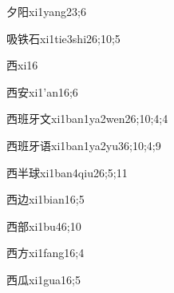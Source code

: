 
\begin{verbete}{夕阳}{xi1yang2}{3;6}
\end{verbete}

\begin{verbete}{吸铁石}{xi1tie3shi2}{6;10;5}
\end{verbete}

\begin{verbete}{西}{xi1}{6}
\end{verbete}

\begin{verbete}{西安}{xi1'an1}{6;6}
\end{verbete}

\begin{verbete}{西班牙文}{xi1ban1ya2wen2}{6;10;4;4}
\end{verbete}

\begin{verbete}{西班牙语}{xi1ban1ya2yu3}{6;10;4;9}
\end{verbete}

\begin{verbete}{西半球}{xi1ban4qiu2}{6;5;11}
\end{verbete}

\begin{verbete}{西边}{xi1bian1}{6;5}
\end{verbete}

\begin{verbete}{西部}{xi1bu4}{6;10}
\end{verbete}

\begin{verbete}{西方}{xi1fang1}{6;4}
\end{verbete}

\begin{verbete}{西瓜}{xi1gua1}{6;5}
\end{verbete}

